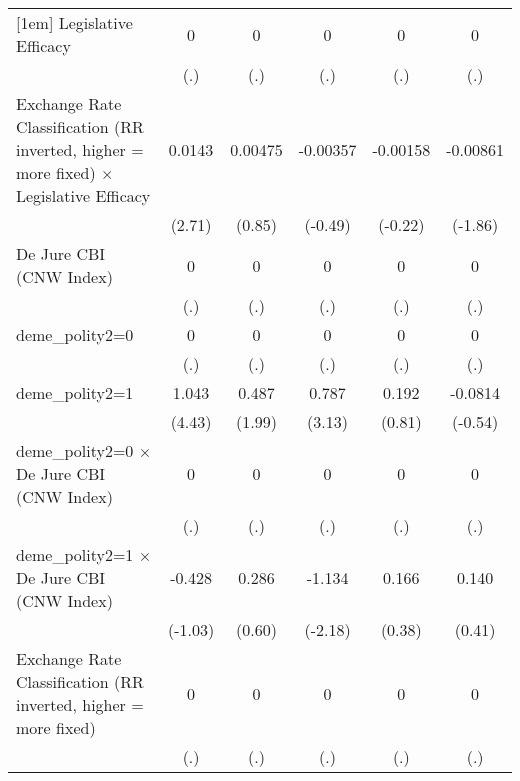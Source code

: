 {\begin{tabular}{l*{5}{c}}
[1em]
Legislative Efficacy&        0         &        0         &        0         &        0         &        0         \\
                &      (.)         &      (.)         &      (.)         &      (.)         &      (.)         \\
[1em]
Exchange Rate Classification (RR inverted, higher = more fixed) $\times$ Legislative Efficacy&   0.0143\sym{**} &  0.00475         & -0.00357         & -0.00158         & -0.00861         \\
                &   (2.71)         &   (0.85)         &  (-0.49)         &  (-0.22)         &  (-1.86)         \\
[1em]
De Jure CBI (CNW Index)&        0         &        0         &        0         &        0         &        0         \\
                &      (.)         &      (.)         &      (.)         &      (.)         &      (.)         \\
[1em]
deme\_polity2=0  &        0         &        0         &        0         &        0         &        0         \\
                &      (.)         &      (.)         &      (.)         &      (.)         &      (.)         \\
[1em]
deme\_polity2=1  &    1.043\sym{***}&    0.487\sym{*}  &    0.787\sym{**} &    0.192         &  -0.0814         \\
                &   (4.43)         &   (1.99)         &   (3.13)         &   (0.81)         &  (-0.54)         \\
[1em]
deme\_polity2=0 $\times$ De Jure CBI (CNW Index)&        0         &        0         &        0         &        0         &        0         \\
                &      (.)         &      (.)         &      (.)         &      (.)         &      (.)         \\
[1em]
deme\_polity2=1 $\times$ De Jure CBI (CNW Index)&   -0.428         &    0.286         &   -1.134\sym{*}  &    0.166         &    0.140         \\
                &  (-1.03)         &   (0.60)         &  (-2.18)         &   (0.38)         &   (0.41)         \\
[1em]
Exchange Rate Classification (RR inverted, higher = more fixed)&        0         &        0         &        0         &        0         &        0         \\
                &      (.)         &      (.)         &      (.)         &      (.)         &      (.)         \\

\end{tabular}}
